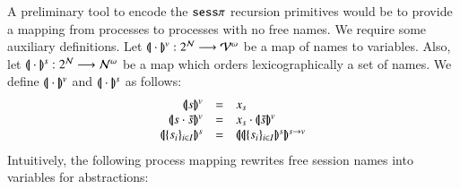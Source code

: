 A preliminary tool to encode the $\mathtt{sess}\pi$ recursion primitives would be to
provide a mapping from processes to processes with no free names.
We require some auxiliary definitions. 
Let $(\!|\!|\cdot|\!|\!)^v: 2^{\mathcal{N}} \longrightarrow \mathcal{V}^\omega$
be a map of names to variables. 
Also, let 
$(\!|\!|\cdot|\!|\!)^s: 2^{\mathcal{N}} \longrightarrow \mathcal{N}^\omega$ be a map which 
orders lexicographically a set of names. 
We define $(\!|\!|\cdot|\!|\!)^v$ and $(\!|\!|\cdot|\!|\!)^s$ as follows:
\[
	\begin{array}{rcl}
		\vmap{s} & = & x_s \\
		\vmap{s \cat \tilde{s}} &=& x_s \cat \vmap{\tilde{s}}\\
		\smap{\set{s_i}_{i \in I}} &=& \svmap{\smap{\set{s_i}_{i \in I}}}
	\end{array}
\]
Intuitively, the following process mapping rewrites free session names into variables for abstractions:
